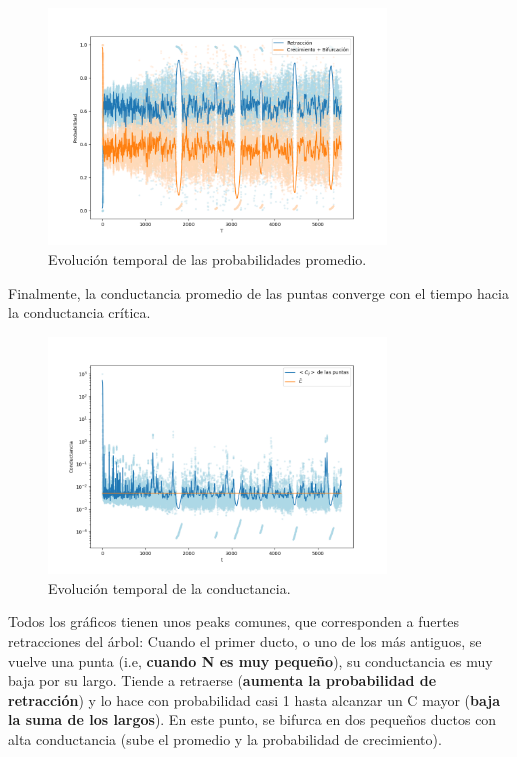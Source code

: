 \documentclass{article}
\begin{document}
\begin{figure}[h!]
    \centering
    \includegraphics[width=0.8\textwidth]{graficos_inst/probs_vs_tiempo.png}
    \caption{Evolución temporal de las probabilidades promedio.}
    \label{fig:evolucion_probabilidades}
\end{figure}

Finalmente, la conductancia promedio de las puntas converge con el tiempo hacia la conductancia crítica.

\begin{figure}[h!]
    \centering
    \includegraphics[width=0.8\textwidth]{graficos_inst/Cij_vs_tiempo.png}
    \caption{Evolución temporal de la conductancia.}
    \label{fig:evolucion_conductancia}
\end{figure}
\newpage

Todos los gráficos tienen unos peaks comunes, que corresponden a fuertes retracciones del árbol:
Cuando el primer ducto, o uno de los más antiguos, se vuelve una punta (i.e, \textbf{cuando N es muy pequeño}), su conductancia es muy baja por su largo.
Tiende a retraerse (\textbf{aumenta la probabilidad de retracción}) y lo hace con probabilidad casi 1 hasta alcanzar un C mayor (\textbf{baja la suma de los largos}).
En este punto, se bifurca en dos pequeños ductos con alta conductancia (sube el promedio y la probabilidad de crecimiento).
\end{document}
